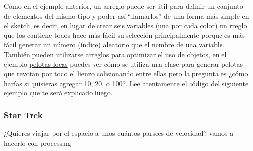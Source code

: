 \documentclass[11pt]{article}
\begin{document}
    Como en el ejemplo anterior, un arreglo puede ser útil para definir un
conjunto de elementos del mismo tipo y poder así ``llamarlos'' de una
forma más simple en el sketch, es decir, en lugar de crear seis
variables (una por cada color) un rreglo que los contiene todos hace más
fácil su selección principalmente porque es más fácil generar un número
(índice) aleatorio que el nombre de una variable. También pueden
utilizarse arreglos para optimizar el uso de objetos, en el ejemplo
\href{https://github.com/piratax007/processing_course/tree/master/Ejemplos/pelotas_locas}{pelotas
locas} puedes ver cómo se utiliza una clase para generar pelotas que
revotan por todo el lienzo colisionando entre ellas pero la pregunta es
¿cómo harías si quisieras agregar 10, 20, o 100?. Lee atentamente el
código del siguiente ejemplo que te será explicado luego.

\hypertarget{star-trek}{%
\subsubsection{Star Trek}\label{star-trek}}

¿Quieres viajar por el espacio a unos cuántos parsecs de velocidad?
vamos a hacerlo con processing
\end{document}

